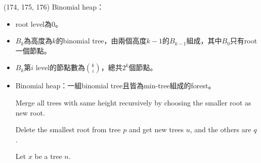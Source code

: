 \item \begin{theorem}{(174, 175, 176)} Binomial heap： \label{binomialheap}\begin{itemize}
        \item root level為$0$。
        \item $B_k$為高度為$k$的binomial tree，由兩個高度$k - 1$的$B_{k - 1}$組成，其中$B_0$只有root一個節點。
        \item $B_k$第$i$ level的節點數為$\binom{k}{i}$，總共$2^k$個節點。
        \item Binomial heap：一組binomial tree且皆為min-tree組成的forest。
        \begin{algorithm}[H]
            \begin{algorithmic}[1]
                    \State Merge all trees with same height recursively by choosing the smaller root as new root.
                \EndFunction
            \end{algorithmic}
        \end{algorithm}
        \begin{algorithm}[H]
            \begin{algorithmic}[1]
                    \State Delete the smallest root from tree $p$ and get new trees $u$, and the others are $q$.
                    \State {}
                \EndFunction
            \end{algorithmic}
        \end{algorithm}
        \begin{algorithm}[H]
            \begin{algorithmic}[1]
                    \State Let $x$ be a tree $n$.
                    \State {}
                \EndFunction
            \end{algorithmic}
        \end{algorithm}
    \end{itemize}
\end{theorem}

